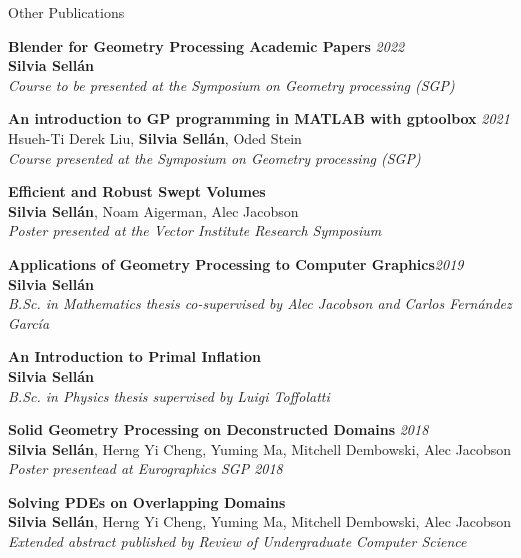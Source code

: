 \documentclass{resume} %
\begin{document}
\begin{rSection}{Other Publications}

{\bf Blender for Geometry Processing Academic Papers}  \hfill {\em 2022} \\ 
\textbf{Silvia Sellán}\\
{\it Course to be presented at the Symposium on Geometry processing (SGP)}


{\bf An introduction to GP programming in MATLAB with gptoolbox}  \hfill {\em 2021} \\ 
Hsueh-Ti Derek Liu, \textbf{Silvia Sellán}, Oded Stein\\
{\it Course presented at the Symposium on Geometry processing (SGP)}

{\bf Efficient and Robust Swept Volumes}\\ 
\textbf{Silvia Sellán}, Noam Aigerman, Alec Jacobson\\
{\it Poster presented at the Vector Institute Research Symposium}

{\bf Applications of Geometry Processing to Computer Graphics}\hfill {\em 2019}\\ 
\textbf{Silvia Sell\'{a}n}\\
{\it B.Sc. in Mathematics thesis co-supervised by Alec Jacobson and Carlos Fernández García}

{\bf An Introduction to Primal Inflation}\\ 
\textbf{Silvia Sell\'{a}n}\\
{\it B.Sc. in Physics thesis supervised by Luigi Toffolatti}

{\bf Solid Geometry Processing on Deconstructed Domains} \hfill {\em 2018} \\ 
\textbf{Silvia Sellán}, Herng Yi Cheng, Yuming Ma, Mitchell Dembowski, Alec Jacobson\\
{\it Poster presentead at Eurographics SGP 2018}

{\bf Solving PDEs on Overlapping Domains}\\ 
\textbf{Silvia Sellán}, Herng Yi Cheng, Yuming Ma, Mitchell Dembowski, Alec Jacobson\\
{\it Extended abstract published by Review of Undergraduate Computer Science}

\end{rSection}
\end{document}
